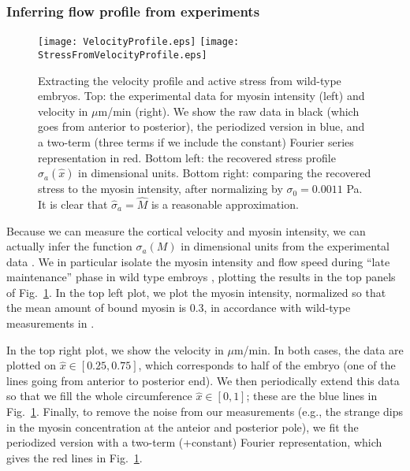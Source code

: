 \documentclass[11pt]{article}
\newcommand{\6}[1]{#1_{\text{6}}}
\newcommand{\3}[1]{#1_{\text{3}}}
\begin{document}
\subsubsection{Inferring flow profile from experiments \label{sec:MyVelFit}}
\begin{figure}
\centering
\texttt{[image: VelocityProfile.eps]}
\texttt{[image: StressFromVelocityProfile.eps]}
\caption{\label{fig:VelProf} Extracting the velocity profile and active stress from wild-type embryos. Top: the experimental data for myosin intensity (left) and velocity in $\mu$m/min (right). We show the raw data in black (which goes from anterior to posterior), the periodized version in blue, and a two-term (three terms if we include the constant) Fourier series representation in red. Bottom left: the recovered stress profile $\sigma_a(\hat x)$ in dimensional units. Bottom right: comparing the recovered stress to the myosin intensity, after normalizing by $\sigma_0=0.0011$ Pa. It is clear that $\hat \sigma_a = \hat M$ is a reasonable approximation.}
\end{figure}


Because we can measure the cortical velocity and myosin intensity, we can actually infer the function $\sigma_a(M)$ in dimensional units from the experimental data \cite{sailer2015dynamic}. We in particular isolate the myosin intensity and flow speed during ``late maintenance'' phase in wild type embroys \cite[Fig.~1B(bottom)]{sailer2015dynamic}, plotting the results in the top panels of Fig.\ \ref{fig:VelProf}. In the top left plot, we plot the myosin intensity, normalized so that the mean amount of bound myosin is 0.3, in accordance with wild-type measurements in \cite[Fig.~S3]{gross2019guiding}. 

In the top right plot, we show the velocity in $\mu$m/min. In both cases, the data are plotted on $\hat x \in [0.25,0.75]$, which corresponds to half of the embryo (one of the lines going from anterior to posterior end). We then periodically extend this data so that we fill the whole circumference $\hat x \in [0,1]$; these are the blue lines in Fig.\ \ref{fig:VelProf}. Finally, to remove the noise from our measurements (e.g., the strange dips in the myosin concentration at the anteior and posterior pole), we fit the periodized version with a two-term (+constant) Fourier representation, which gives the red lines in Fig.\ \ref{fig:VelProf}. 
\end{document}
